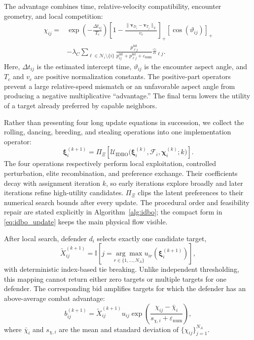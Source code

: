 \documentclass[lettersize,journal]{IEEEtran}
\begin{document}
The advantage combines time, relative-velocity compatibility, encounter geometry, and local
competition:
\begin{equation}
\label{eq:adversarial_advantage}
\begin{aligned}
\chi_{ij}={}&
\exp\!\left(-\frac{\Delta t_{ij}}{T_c}\right)
\left[1-\frac{\|\mathbf v_{D_i}-\mathbf v_{T_j}\|_2}{v_c}\right]_{+}
\left[\cos(\vartheta_{ij})\right]_{+}\\
&-\lambda_C\!\sum_{\ell\in\mathcal N_i\setminus\{i\}}
\frac{p_{\ell j}^{\mathrm{int}}}
{p_{ij}^{\mathrm{int}}+p_{\ell j}^{\mathrm{int}}+\varepsilon_{\mathrm{num}}}
\widehat\pi_{\ell j}.
\end{aligned}
\end{equation}
Here, $\Delta t_{ij}$ is the estimated intercept time, $\vartheta_{ij}$ is the encounter
aspect angle, and $T_c$ and $v_c$ are positive normalization constants. The positive-part
operators prevent a large relative-speed mismatch or an unfavorable aspect angle from
producing a negative multiplicative ``advantage.'' The final term lowers the utility of a
target already preferred by capable neighbors.

Rather than presenting four long update equations in succession, we collect the rolling,
dancing, breeding, and stealing operations into one implementation operator:
\begin{equation}
\label{eq:idbo_update}
\boldsymbol\xi_i^{(k+1)}=
\Pi_{\Xi}\!\left[
\mathcal U_{\mathrm{IDBO}}
\bigl(\boldsymbol\xi_i^{(k)},\mathcal F_i,
      \boldsymbol\chi_i^{(k)};k\bigr)\right].
\end{equation}
The four operations respectively perform local exploitation, controlled perturbation, elite
recombination, and preference exchange. Their coefficients decay with assignment iteration
$k$, so early iterations explore broadly and later iterations refine high-utility candidates.
$\Pi_{\Xi}$ clips the latent preferences to their numerical search bounds after every update.
The procedural order and feasibility repair are stated explicitly in Algorithm~\ref{alg:idbo};
the compact form in \eqref{eq:idbo_update} keeps the main physical flow visible.

After local search, defender $d_i$ selects exactly one candidate target,
\begin{equation}
\label{eq:candidate_assignment}
\widetilde X_{ij}^{(k+1)}=
\mathbb I\!\left[j=\underset{r\in\{1,\ldots,N_A\}}{\arg\max}
u_{ir}(\boldsymbol\xi_i^{(k+1)})\right],
\end{equation}
with deterministic index-based tie breaking. Unlike independent thresholding, this mapping
cannot return either zero targets or multiple targets for one defender. The corresponding bid
amplifies targets for which the defender has an above-average combat advantage:
\begin{equation}
\label{eq:bid_formulation}
b_{ij}^{(k+1)}=\widetilde X_{ij}^{(k+1)}u_{ij}
\exp\!\left(\frac{\chi_{ij}-\bar\chi_i}
{s_{\chi,i}+\varepsilon_{\mathrm{num}}}\right),
\end{equation}
where $\bar\chi_i$ and $s_{\chi,i}$ are the mean and standard deviation of
$\{\chi_{ij}\}_{j=1}^{N_A}$.
\end{document}
